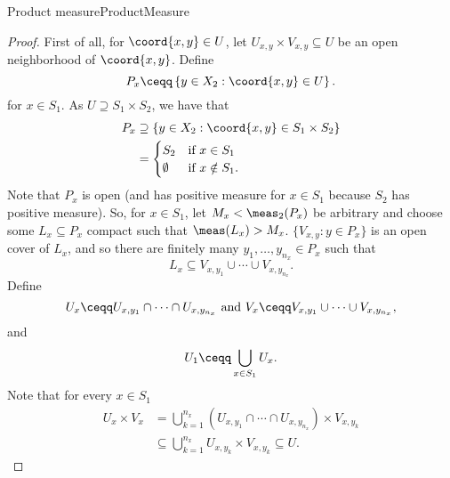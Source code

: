 \begin{thm}{Product measure}{ProductMeasure}
\begin{proof}
First of all, for $\coord{x,y}\in U$, let $U_{x,y}\times V_{x,y}\subseteq U$ be an open neighborhood of $\coord{x,y}$.  Define
\begin{equation}
P_x\ceqq \left\{ y\in X_2:\coord{x,y}\in U\right\} .
\end{equation}
for $x\in S_1$.  As $U\supseteq S_1\times S_2$, we have that
\begin{equation}
\begin{split}
P_x & \supseteq \left\{ y\in X_2:\coord{x,y}\in S_1\times S_2\right\} \\
& =\begin{cases}S_2 & \text{if }x\in S_1 \\ \emptyset & \text{if }x\notin S_1.\end{cases}
\end{split}
\end{equation}
Note that $P_x$ is open (and has positive measure for $x\in S_1$ because $S_2$ has positive measure).  So, for $x\in S_1$, let $M_x<\meas _2(P_x)$ be arbitrary and choose some $L_x\subseteq P_x$ compact such that $\meas (L_x)>M_x$.  $\{ V_{x,y}:y\in P_x\}$ is an open cover of $L_x$, and so there are finitely many $y_1,\ldots ,y_{n_x}\in P_x$ such that
\begin{equation}
L_x\subseteq V_{x,y_1}\cup \cdots \cup V_{x,y_{n_x}}.
\end{equation}
Define
\begin{equation*}
U_x\ceqq U_{x,y_1}\cap \cdots \cap U_{x,y_{n_x}}\text{ and }V_x\ceqq V_{x,y_1}\cup \cdots \cup V_{x,y_{n_x}},
\end{equation*}
and
\begin{equation}
U_1\ceqq \bigcup _{x\in S_1}U_x.
\end{equation}
Note that for every $x\in S_1$
\begin{equation}\label{eqn5.2.45}
\begin{split}
U_x\times V_x & =\bigcup _{k=1}^{n_x}\left( U_{x,y_1}\cap \cdots \cap U_{x,y_{n_x}}\right) \times V_{x,y_k} \\
& \subseteq \bigcup _{k=1}^{n_x}U_{x,y_k}\times V_{x,y_k}\subseteq U.
\end{split}
\end{equation}


\end{proof}
\end{thm}
